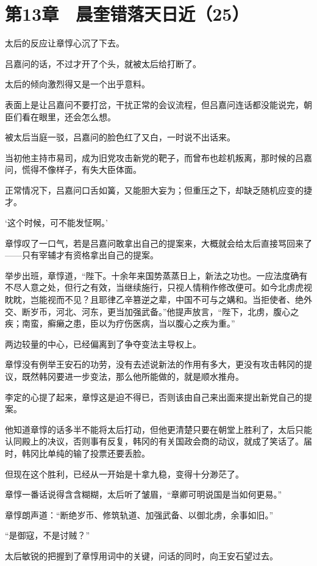 \section{第13章　晨奎错落天日近（25）}

太后的反应让章惇心沉了下去。

吕嘉问的话，不过才开了个头，就被太后给打断了。

太后的倾向激烈得又是一个出乎意料。

表面上是让吕嘉问不要打岔，干扰正常的会议流程，但吕嘉问连话都没能说完，朝臣们看在眼里，还会怎么想。

被太后当庭一驳，吕嘉问的脸色红了又白，一时说不出话来。

当初他主持市易司，成为旧党攻击新党的靶子，而曾布也趁机叛离，那时候的吕嘉问，慌得不像样子，有失大臣体面。

正常情况下，吕嘉问口舌如簧，又能胆大妄为；但重压之下，却缺乏随机应变的捷才。

‘这个时候，可不能发怔啊。’

章惇叹了一口气，若是吕嘉问敢拿出自己的提案来，大概就会给太后直接骂回来了——只有宰辅才有资格拿出自己的提案。

举步出班，章惇道，“陛下。十余年来国势蒸蒸日上，新法之功也。一应法度确有不尽人意之处，但行之有效，当继续施行，只视人情稍作修改便可。如今北虏虎视眈眈，岂能视而不见？且耶律乙辛篡逆之辈，中国不可与之媾和。当拒使者、绝外交、断岁币，河北、河东，更当加强武备。”他提声放言，“陛下，北虏，腹心之疾；南蛮，癣癞之患，臣以为疗伤医病，当以腹心之疾为重。”

两边较量的中心，已经偏离到了争夺变法主导权上。

章惇没有例举王安石的功劳，没有去述说新法的作用有多大，更没有攻击韩冈的提议，既然韩冈要进一步变法，那么他所能做的，就是顺水推舟。

李定的心提了起来，章惇这是迫不得已，否则该由自己来出面来提出新党自己的提案。

他知道章惇的话多半不能将太后打动，但他更清楚只要在朝堂上胜利了，太后只能认同殿上的决议，否则事有反复，韩冈的有关国政会商的动议，就成了笑话了。届时，韩冈比单纯的输了投票还要丢脸。

但现在这个胜利，已经从一开始是十拿九稳，变得十分渺茫了。

章惇一番话说得含含糊糊，太后听了皱眉，“章卿可明说国是当如何更易。”

章惇朗声道：“断绝岁币、修筑轨道、加强武备、以御北虏，余事如旧。”

“是御寇，不是讨贼？”

太后敏锐的把握到了章惇用词中的关键，问话的同时，向王安石望过去。

